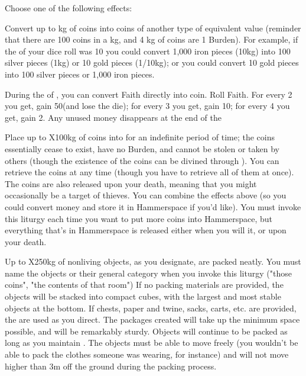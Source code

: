 \begin{multicols*}{2}
\LITURGY [
  Name = Lay Assistance,
  Link = arcana-mystery-lay-assistance,
  Paradigm = Civilized,
  Duration = See Below
]

Choose one of the following effects:

  Convert up to \SUMDICE kg of coins into coins of another type of equivalent value (reminder that there are 100 coins in a kg, and 4 kg of coins are 1 Burden). For example, if the \SUMDICE of your dice roll was 10 you could convert 1,000 iron pieces (10kg) into 100 silver pieces (1kg) or 10 gold pieces (1/10kg); or you could convert 10 gold pieces into 100 silver pieces or 1,000 iron pieces. 

 During the  of , you can convert Faith directly into coin.  Roll \DICE Faith.  For every 2 you get, gain 50\FE (and lose the die); for every 3 you get, gain 10\AG; for every 4 you get, gain 2\AU. Any unused money disappears at the end of the 

 Place up to \DICE X100kg of coins into  for an indefinite period of time; the coins essentially cease to exist, have no Burden, and cannot be stolen or taken by others (though the existence of the coins can be divined through ).  You can retrieve the coins at any time (though you have to retrieve all of them at once).  The coins are also released upon your death, meaning that you might occasionally be a target of thieves. You can combine the effects above (so you could convert money and store it in Hammerspace if you'd like).  You must invoke this liturgy each time you want to put more coins into Hammerspace, but everything that's in Hammerspace is released either when you will it, or upon your death.

 Up to \DICE X250kg of nonliving objects, as you designate, are packed neatly. You must name the objects or their general category when you invoke this liturgy ("those coins", "the contents of that room") If no packing materials are provided, the objects will be stacked into compact cubes, with the largest and most stable objects at the bottom. If chests, paper and twine, sacks, carts, etc. are provided, the are used as you direct. The packages created will take up the minimum space possible, and will be remarkably sturdy. Objects will continue to be packed as long as you maintain . The objects must be able to move freely (you wouldn't be able to pack the clothes someone was wearing, for instance) and will not move higher than 3m off the ground during the packing process. 


\end{multicols*}
